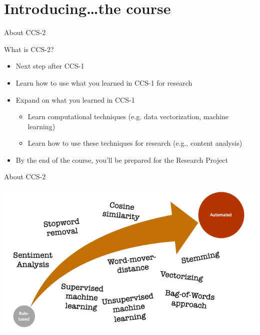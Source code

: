 \documentclass[handout]{beamer}
\begin{document}
\section{Introducing\ldots the course}



\begin{frame}{About CCS-2} 

What is CCS-2?
	\begin{itemize}
		\item Next step after CCS-1 %
		\item Learn how to use what you learned in CCS-1 for research
		\item Expand on what you learned in CCS-1
		\begin{itemize}
			\item Learn computational techniques (e.g. data vectorization, machine learning)
			\item Learn how to use these techniques for research (e.g., content analysis)
		\end{itemize}
		\item By the end of the course, you'll be prepared for the Research Project
	\end{itemize}
	
\end{frame}


\begin{frame}{About CCS-2}
	
	\begin{center}
		\includegraphics[width=\linewidth,height=\textheight,keepaspectratio]{../pictures/Roadmap_terms.png} 
	\end{center}
	
\end{frame}
\end{document}
